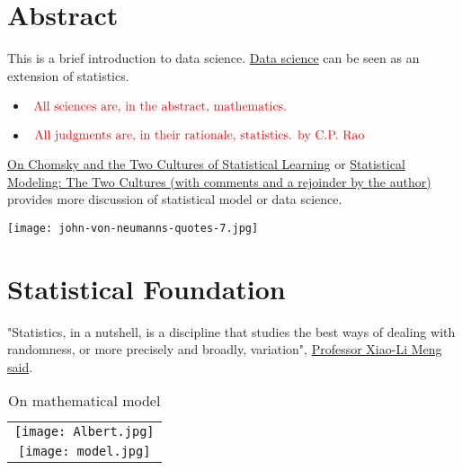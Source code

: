 \documentclass[titlestyle=hang,11pt]{elegantbook}
\author{Jinxiong \& Zhang}
\begin{document}
\maketitle
\tableofcontents
\mainmatter

\chapter{Abstract}

This is a brief introduction to data science. \href{https://www.wikiwand.com/en/Data_science}{Data science} can be seen as an extension of statistics.

\begin{itemize}
    \item $\textcolor{red}{\text{ All sciences are, in the abstract, mathematics.}}$
	\item $\textcolor{red}{\text{ All judgments are, in their rationale, statistics.  by C.P. Rao}}$
\end{itemize}

\href{http://norvig.com/chomsky.html}{On Chomsky and the Two Cultures of Statistical Learning} or \href{https://projecteuclid.org/euclid.ss/1009213726}{Statistical Modeling: The Two Cultures (with comments and a rejoinder by the author)} provides more discussion of statistical model or data science.

\texttt{[image: john-von-neumanns-quotes-7.jpg]}

\chapter{Statistical Foundation}

"Statistics, in a nutshell, is a discipline that studies the best ways of dealing with randomness, or more precisely and broadly, variation", \href{https://statistics.fas.harvard.edu/about}{Professor Xiao-Li Meng said}.

\begin{table}[h]
	\centering
	\caption{On mathematical model}
	\begin{tabular}{|c|}
		\hline
		\texttt{[image: Albert.jpg]} \\
		\texttt{[image: model.jpg]} \\
	\end{tabular}
\end{table}
\end{document}

